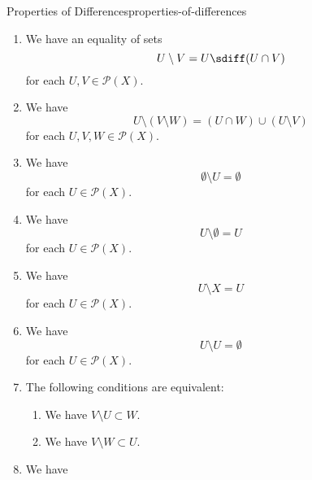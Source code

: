 \begin{proposition}{Properties of Differences}{properties-of-differences}
\begin{enumerate}
        \item\label{properties-of-differences-interaction-with-symmetric-differences}We have an equality of sets
            \[
                U\setminus V%
                =%
                U\sdiff(U\cap V)%
            \]%
            for each $U,V\in\mathcal{P}(X)$.
        \item\label{properties-of-differences-triple-differences}We have
            \[
                U\setminus(V\setminus W)%
                =%
                (U\cap W)\cup(U\setminus V)%
            \]%
            for each $U,V,W\in\mathcal{P}(X)$.
        \item\label{properties-of-differences-left-annihilation}We have
            \[
                \emptyset\setminus U%
                =%
                \emptyset%
            \]%
            for each $U\in\mathcal{P}(X)$.
        \item\label{properties-of-differences-right-unitality}We have
            \[
                U\setminus\emptyset%
                =%
                U%
            \]%
            for each $U\in\mathcal{P}(X)$.
        \item\label{properties-of-differences-right-annihilation}We have
            \[
                U\setminus X%
                =%
                U%
            \]%
            for each $U\in\mathcal{P}(X)$.
        \item\label{properties-of-differences-invertibility}We have
            \[
                U\setminus U
                =
                \emptyset
            \]%
            for each $U\in\mathcal{P}(X)$.
        \item\label{properties-of-differences-interaction-with-containment}The following conditions are equivalent:
            \begin{enumerate}
                \item\label{properties-of-differences-interaction-with-containment-a}We have $V\setminus U\subset W$.
                \item\label{properties-of-differences-interaction-with-containment-b}We have $V\setminus W\subset U$.
            \end{enumerate}
        \item\label{properties-of-differences-interaction-with-characteristic-functions}We have

\end{enumerate}
\end{proposition}
